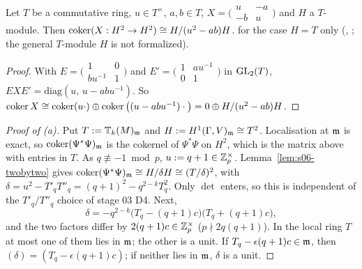\begin{lemma}\label{lem:s06-twobytwo}
Let $T$ be a commutative ring, $u\in T^\times$, $a,b\in T$, $X=\big(\begin{smallmatrix}u&-a\\-b&u\end{smallmatrix}\big)$ and $H$ a $T$-module. Then
$\operatorname{coker}(X:H^2\to H^2)\cong H/(u^2-ab)H$. \stproved{} \stformal{} for the case $H=T$ only (, ; the general $T$-module $H$ is not formalized).
\end{lemma}
\begin{proof}
With $E=\big(\begin{smallmatrix}1&0\\ bu^{-1}&1\end{smallmatrix}\big)$ and $E'=\big(\begin{smallmatrix}1&au^{-1}\\0&1\end{smallmatrix}\big)$ in $\mathrm{GL}_2(T)$,
$EXE'=\mathrm{diag}(u,\,u-abu^{-1})$. So $\operatorname{coker} X\cong\operatorname{coker}(u\cdot)\oplus\operatorname{coker}\big((u-abu^{-1})\cdot\big)=0\oplus H/(u^2-ab)H$.
\end{proof}

\begin{proof}[Proof of (a)]
Put $T:=\mathbb{T}_k(M)_{\mathfrak{m}}$ and $H:=H^1(\Gamma,V)_{\mathfrak{m}}\cong T^2$. Localisation at $\mathfrak{m}$ is exact, so $\operatorname{coker}(\Psi^*\Psi)_{\mathfrak{m}}$ is the cokernel of $\Psi^*\Psi$ on
$H^2$, which is the matrix above with entries in $T$. As $q\not\equiv-1\bmod p$, $u:=q+1\in\mathbb{Z}_p^\times$. Lemma~\ref{lem:s06-twobytwo} gives
$\operatorname{coker}(\Psi^*\Psi)_{\mathfrak{m}}\cong H/\delta H\cong(T/\delta)^2$, with $\delta=u^2-T'_qT''_q=(q+1)^2-q^{2-k}T_q^2$. Only $\det$ enters, so this is
independent of the $T'_q/T''_q$ choice of stage 03 D4. Next,
\[\delta=-q^{2-k}\big(T_q-(q+1)c\big)\big(T_q+(q+1)c\big),\]
and the two factors differ by $2(q+1)c\in\mathbb{Z}_p^\times$ ($p\nmid2q(q+1)$). In the local ring $T$ at most one of them lies in $\mathfrak{m}$; the other is a
unit. If $T_q-\epsilon(q+1)c\in\mathfrak{m}$, then $(\delta)=(T_q-\epsilon(q+1)c)$; if neither lies in $\mathfrak{m}$, $\delta$ is a unit.
\end{proof}

